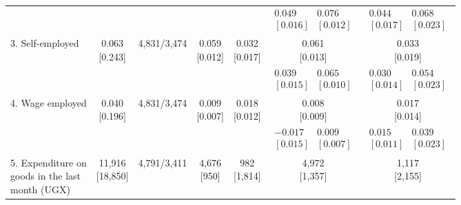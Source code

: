 \documentclass{report}
\begin{document}
\begin{table}[H]
{\begin{tabular}{lcccccc}
 &  &  &  &  & $\begin{array}{cc} 0.049 & 0.076\\{[ 0.016 ]} & {[ 0.012 ]}\end{array}$ & $\begin{array}{cc} 0.044 & 0.068\\{[ 0.017 ]} & {[ 0.023 ]}\end{array}$\\
3. Self-employed & \makecell[c]{0.063\\{[0.243]}} & 4,831/3,474 & \makecell[c]{0.059\\{[0.012]}} & \makecell[c]{0.032\\{[0.017]}} & \makecell[c]{0.061\\{[0.013]}} & \makecell[c]{0.033\\{[0.019]}}\\
\addlinespace
 &  &  &  &  & $\begin{array}{cc} 0.039 & 0.065\\{[ 0.015 ]} & {[ 0.010 ]}\end{array}$ & $\begin{array}{cc} 0.030 & 0.054\\{[ 0.014 ]} & {[ 0.023 ]}\end{array}$\\
4. Wage employed & \makecell[c]{0.040\\{[0.196]}} & 4,831/3,474 & \makecell[c]{0.009\\{[0.007]}} & \makecell[c]{0.018\\{[0.012]}} & \makecell[c]{0.008\\{[0.009]}} & \makecell[c]{0.017\\{[0.014]}}\\
 &  &  &  &  & $\begin{array}{cc} -0.017 & 0.009\\{[ 0.015 ]} & {[ 0.007 ]}\end{array}$ & $\begin{array}{cc} 0.015 & 0.039\\{[ 0.011 ]} & {[ 0.023 ]}\end{array}$\\
\makecell[l]{5. Expenditure on\\\hspace{1em}goods in the last\\\hspace{1em}month (UGX)} & \makecell[c]{11,916\\{[18,850]}} & 4,791/3,411 & \makecell[c]{4,676\\{[950]}} & \makecell[c]{982\\{[1,814]}} & \makecell[c]{4,972\\{[1,357]}} & \makecell[c]{1,117\\{[2,155]}}\\

\end{tabular}}
\end{table}
\end{document}
